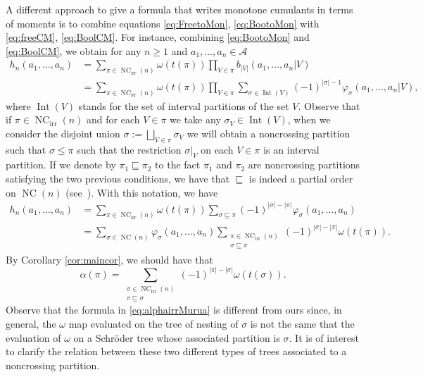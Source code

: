 \documentclass[pdftex]{sigma}%
\numberwithin{equation}{section}
\newcommand{\A}{\mathcal{A}}
\newcommand{\NC}{\operatorname{NC}}
\newcommand{\Int}{\operatorname{Int}}
\begin{document}
\begin{Remark}
A different approach to give a formula that writes monotone cumulants in terms of moments is to combine equations \eqref{eq:FreetoMon}, \eqref{eq:BootoMon} with \eqref{eq:freeCM}, \eqref{eq:BoolCM}. For instance, combining \eqref{eq:BootoMon} and \eqref{eq:BoolCM}, we obtain for any $n\geq1$ and $a_1,\dots,a_n\in \A$
\begin{align*}
h_n(a_1,\dots,a_n) &= \sum_{\pi\in \NC_{\mathrm{irr}}(n)} \omega(t(\pi)) \prod_{V\in \pi} b_{|V|}(a_1,\dots,a_n|V)
\\ &= \sum_{\pi\in \NC_{\mathrm{irr}}(n)} \omega(t(\pi)) \prod_{V\in \pi} \sum_{\sigma \in \Int(V)} (-1)^{|\sigma|-1} \varphi_\sigma(a_1,\dots,a_n|V),
\end{align*}
where $\Int(V)$ stands for the set of interval partitions of the set $V$. Observe that if $\pi\in \NC_{\mathrm{irr}}(n)$ and for each $V\in \pi$ we take any $\sigma_V \in \Int(V)$, when we consider the disjoint union $\sigma :=\bigsqcup_{V\in \pi} \sigma_V$ we will obtain a noncrossing partition such that $\sigma\leq \pi$ such that the restriction $\sigma|_V$ on each $V\in \pi$ is an interval partition. If we denote by $ \pi_1 \sqsubseteq\pi_2$ to the fact $\pi_1$ and $\pi_2$ are noncrossing partitions satisfying the two previous conditions, we have that $\sqsubseteq$ is indeed a partial order on $\NC(n)$ (see~\cite{JVer}). With this notation, we have
\begin{align*}
h_n(a_1,\dots,a_n) &= \sum_{\pi\in \NC_{\mathrm{irr}}(n)} \omega(t(\pi)) \sum_{\sigma\sqsubseteq\pi} (-1)^{|\sigma|- |\pi|} \varphi_\sigma(a_1,\dots,a_n)
\\ &= \sum_{\sigma \in \NC(n)} \varphi_\sigma(a_1,\dots,a_n) \sum_{\substack{\pi\in \NC_{\mathrm{irr}}(n)\\\sigma\sqsubseteq\pi}} (-1)^{|\sigma|- |\pi|} \omega(t(\pi)).
\end{align*}
By Corollary \ref{cor:maincor}, we should have that
\begin{equation}\label{eq:alphairrMurua}
\alpha(\pi ) = \sum_{\substack{\sigma\in \NC_{\mathrm{irr}}(n)\\\pi\sqsubseteq\sigma}} (-1)^{|\pi|- |\sigma|} \omega(t(\sigma)).
\end{equation}
Observe that the formula in \eqref{eq:alphairrMurua} is different from ours since, in general, the $\omega$ map evaluated on the tree of nesting of $\sigma$ is not the same that the evaluation of $\omega$ on a Schr\"oder tree whose associated partition is $\sigma$. It is of interest to clarify the relation between these two different types of trees associated to a noncrossing partition.
\end{Remark}
\end{document}
